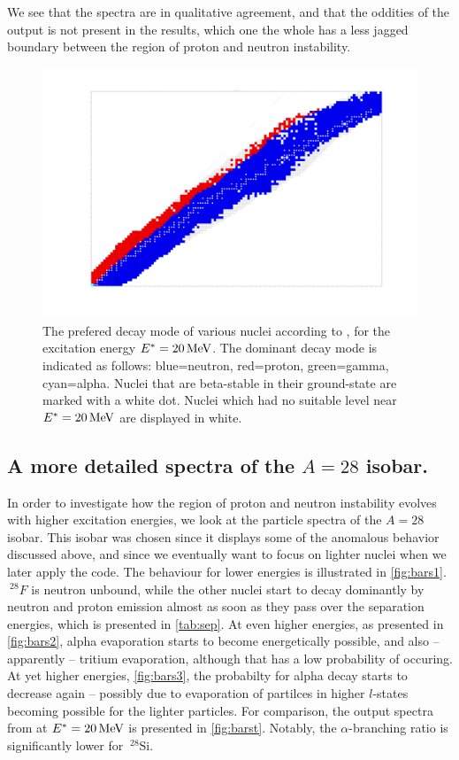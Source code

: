 We see that the spectra are in qualitative agreement, and that the oddities of the \codename{} output is not present in the  results, which one the whole has a less jagged boundary between the region of proton and neutron instability.
\begin{figure}
\begin{center}
\includegraphics[width=\textwidth]{figures/spectra/talys-20-spectra.pdf}
\caption{\label{fig:chart-talys} The prefered decay mode of various nuclei according to , for the excitation energy $E^*=\unit[20]{MeV}$. The dominant decay mode is indicated as follows: blue=neutron, red=proton, green=gamma, cyan=alpha. Nuclei that are beta-stable in their ground-state are marked with a white dot. Nuclei which had no suitable level near $E^*=\unit[20]{MeV}$ are displayed in white.}
\end{center}
\end{figure}

\subsection{A more detailed spectra of the $A=28$ isobar.}
In order to investigate how the region of proton and neutron instability evolves with higher excitation energies, we look at the particle spectra of the $A=28$ isobar. This isobar was chosen since it displays some of the anomalous behavior discussed above, and since we eventually want to focus on lighter nuclei when we later apply the code. The behaviour for lower energies is illustrated in \autoref{fig:bars1}. $~^{28}F$ is neutron unbound, while the other nuclei start to decay dominantly by neutron and proton emission almost as soon as they pass over the separation energies, which is presented in \autoref{tab:sep}. At even higher energies, as presented in \autoref{fig:bars2}, alpha evaporation starts to become energetically possible, and also -- apparently -- tritium evaporation, although that has a low probability of occuring. At yet higher energies, \autoref{fig:bars3}, the probabilty for alpha decay starts to decrease again -- possibly due to evaporation of partilces in higher $l$-states becoming possible for the lighter particles. For comparison, the output spectra from  at $E^*=\unit[20]{MeV}$ is presented in \autoref{fig:barst}. Notably, the $\alpha$-branching ratio is significantly lower for $~^{28}\mathrm{Si}$.

